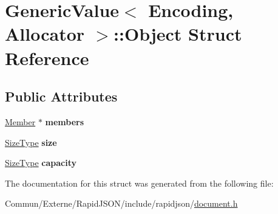 \hypertarget{struct_generic_value_1_1_object}{}\section{Generic\+Value$<$ Encoding, Allocator $>$\+:\+:Object Struct Reference}
\label{struct_generic_value_1_1_object}
\subsection*{Public Attributes}
\begin{DoxyCompactItemize}
\item 
\hyperlink{class_generic_value_a7ccf27c44058b4c11c3efc6473afb886}{Member} $\ast$ {\bfseries members}\hypertarget{struct_generic_value_1_1_object_ab51b8366577cb12f0280e4a6d7dab926}{}\label{struct_generic_value_1_1_object_ab51b8366577cb12f0280e4a6d7dab926}

\item 
\hyperlink{rapidjson_8h_a5ed6e6e67250fadbd041127e6386dcb5}{Size\+Type} {\bfseries size}\hypertarget{struct_generic_value_1_1_object_a10da3d9035961100ed11f955a4afd2b6}{}\label{struct_generic_value_1_1_object_a10da3d9035961100ed11f955a4afd2b6}

\item 
\hyperlink{rapidjson_8h_a5ed6e6e67250fadbd041127e6386dcb5}{Size\+Type} {\bfseries capacity}\hypertarget{struct_generic_value_1_1_object_ab22a81c7ac57baf0d4ea343dfd6d8b33}{}\label{struct_generic_value_1_1_object_ab22a81c7ac57baf0d4ea343dfd6d8b33}

\end{DoxyCompactItemize}


The documentation for this struct was generated from the following file\+:\begin{DoxyCompactItemize}
\item 
Commun/\+Externe/\+Rapid\+J\+S\+O\+N/include/rapidjson/\hyperlink{document_8h}{document.\+h}\end{DoxyCompactItemize}
